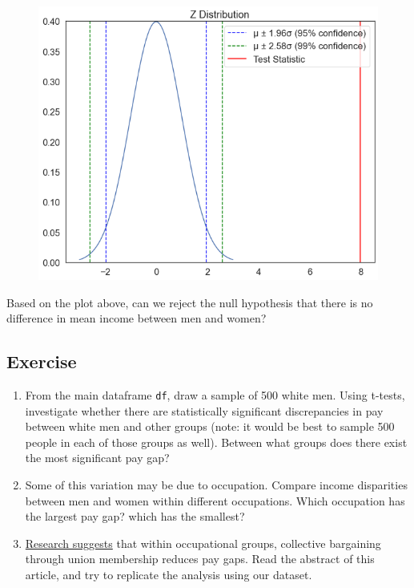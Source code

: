 \documentclass[
  letterpaper,
  DIV=11,
  numbers=noendperiod]{scrreprt}
\providecommand{\tightlist}{%
  \setlength{\itemsep}{0pt}\setlength{\parskip}{0pt}}\usepackage{longtable,booktabs,array}
\begin{document}
\begin{figure}[H]

{\centering \includegraphics{notebooks/W07. Hypothesis Testing_files/figure-pdf/cell-13-output-1.png}

}

\end{figure}

Based on the plot above, can we reject the null hypothesis that there is
no difference in mean income between men and women?

\hypertarget{exercise-22}{%
\subsection{Exercise}\label{exercise-22}}

\begin{enumerate}
\def\labelenumi{\arabic{enumi}.}
\tightlist
\item
  From the main dataframe \texttt{df}, draw a sample of 500 white men.
  Using t-tests, investigate whether there are statistically significant
  discrepancies in pay between white men and other groups (note: it
  would be best to sample 500 people in each of those groups as well).
  Between what groups does there exist the most significant pay gap?
\item
  Some of this variation may be due to occupation. Compare income
  disparities between men and women within different occupations. Which
  occupation has the largest pay gap? which has the smallest?
\item
  \href{https://journals.sagepub.com/doi/abs/10.1177/0730888401028004005}{Research
  suggests} that within occupational groups, collective bargaining
  through union membership reduces pay gaps. Read the abstract of this
  article, and try to replicate the analysis using our dataset.
\end{enumerate}
\end{document}
